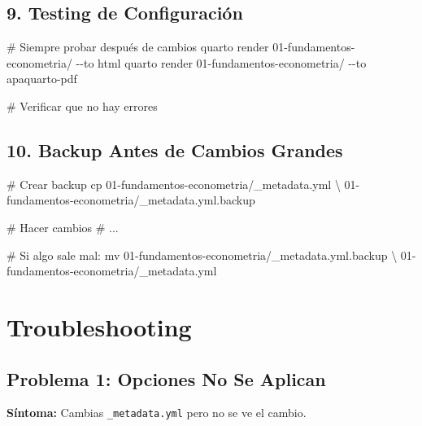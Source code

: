 \documentclass[
  doc,
  floatsintext,
  longtable,
  a4paper,
  nolmodern,
  notxfonts,
  notimes,
  12pt,
  colorlinks=true,linkcolor=blue,citecolor=blue,urlcolor=blue]{apa7}
\newenvironment{Shaded}{\begin{snugshade}}{\end{snugshade}}
\newcommand{\AttributeTok}[1]{\textcolor[rgb]{0.40,0.45,0.13}{#1}}
\newcommand{\CommentTok}[1]{\textcolor[rgb]{0.37,0.37,0.37}{#1}}
\newcommand{\DataTypeTok}[1]{\textcolor[rgb]{0.68,0.00,0.00}{#1}}
\newcommand{\ExtensionTok}[1]{\textcolor[rgb]{0.00,0.23,0.31}{#1}}
\newcommand{\FunctionTok}[1]{\textcolor[rgb]{0.28,0.35,0.67}{#1}}
\newcommand{\NormalTok}[1]{\textcolor[rgb]{0.00,0.23,0.31}{#1}}
\begin{document}
\subsection{9. Testing de
Configuración}\label{testing-de-configuraciuxf3n}

\begin{Shaded}
\begin{Highlighting}[]
\CommentTok{\# Siempre probar después de cambios}
\ExtensionTok{quarto}\NormalTok{ render 01{-}fundamentos{-}econometria/ }\AttributeTok{{-}{-}to}\NormalTok{ html}
\ExtensionTok{quarto}\NormalTok{ render 01{-}fundamentos{-}econometria/ }\AttributeTok{{-}{-}to}\NormalTok{ apaquarto{-}pdf}

\CommentTok{\# Verificar que no hay errores}
\end{Highlighting}
\end{Shaded}

\subsection{10. Backup Antes de Cambios
Grandes}\label{backup-antes-de-cambios-grandes}

\begin{Shaded}
\begin{Highlighting}[]
\CommentTok{\# Crear backup}
\FunctionTok{cp}\NormalTok{ 01{-}fundamentos{-}econometria/\_metadata.yml }\DataTypeTok{\textbackslash{}}
\NormalTok{   01{-}fundamentos{-}econometria/\_metadata.yml.backup}

\CommentTok{\# Hacer cambios}
\CommentTok{\# ...}

\CommentTok{\# Si algo sale mal:}
\FunctionTok{mv}\NormalTok{ 01{-}fundamentos{-}econometria/\_metadata.yml.backup }\DataTypeTok{\textbackslash{}}
\NormalTok{   01{-}fundamentos{-}econometria/\_metadata.yml}
\end{Highlighting}
\end{Shaded}

\section{Troubleshooting}\label{troubleshooting}

\subsection{Problema 1: Opciones No Se
Aplican}\label{problema-1-opciones-no-se-aplican}

\textbf{Síntoma:} Cambias \texttt{\_metadata.yml} pero no se ve el
cambio.
\end{document}
